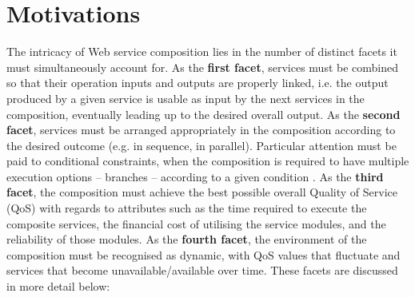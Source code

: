 \section{Motivations}
The intricacy of Web service composition lies in the number of distinct facets it must simultaneously account for. As the \textbf{first facet}, services must be combined so that their operation inputs and outputs are properly linked, i.e. the output produced by a given service is usable as input by the next services in the composition, eventually leading up to the desired overall output. As the \textbf{second facet}, services must be arranged appropriately in the composition according to the desired outcome (e.g. in sequence, in parallel). Particular attention must be paid to conditional constraints, when the composition is required to have multiple execution options -- branches -- according to a given condition \cite{wang2014automated,sohrabi2009web,karakoc2009composing}. As the \textbf{third facet}, the composition must achieve the best possible overall Quality of Service (QoS) with regards to attributes such as the time required to execute the composite services, the financial cost of utilising the service modules, and the reliability of those modules. As the \textbf{fourth facet}, the environment of the composition must be recognised as dynamic, with QoS values that fluctuate and services that become unavailable/available over time. These facets are discussed in more detail below:

